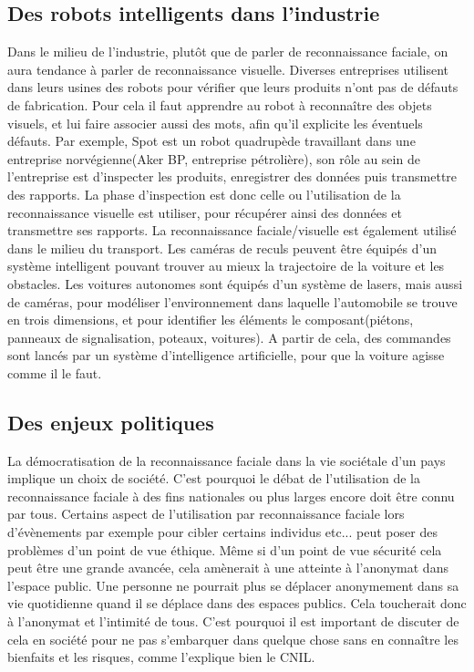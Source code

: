 \documentclass[12pt,french]{article}
\theoremstyle{plain}
\theoremstyle{definition}
\begin{document}
\subsection{Des robots intelligents dans l'industrie}
Dans le milieu de l'industrie, plutôt que de parler de reconnaissance faciale, on aura tendance à parler de reconnaissance visuelle. Diverses entreprises utilisent dans leurs usines des robots pour vérifier que leurs produits n'ont pas de défauts de fabrication. Pour cela il faut apprendre au robot à reconnaître des objets visuels, et lui faire associer aussi des mots, afin qu'il explicite les éventuels défauts. Par exemple, Spot est un robot quadrupède travaillant dans une entreprise norvégienne(Aker BP, entreprise pétrolière), son rôle au sein de l'entreprise est d'inspecter les produits, enregistrer des données puis transmettre des rapports. La phase d'inspection est donc celle ou l'utilisation de la reconnaissance visuelle est utiliser, pour récupérer ainsi des données et transmettre ses rapports.
La reconnaissance faciale/visuelle est également utilisé dans le milieu du transport. Les caméras de reculs peuvent être équipés d'un système intelligent pouvant trouver au mieux la trajectoire de la voiture et les obstacles. 
Les voitures autonomes sont équipés d'un système de lasers, mais aussi de caméras, pour modéliser l'environnement dans laquelle l'automobile se trouve en trois dimensions, et pour identifier les éléments le composant(piétons, panneaux de signalisation, poteaux, voitures). A partir de cela, des commandes sont lancés par un système d'intelligence artificielle, pour que la voiture agisse comme il le faut.
\subsection{Des enjeux politiques}
La démocratisation de la reconnaissance faciale dans la vie sociétale d'un pays implique un choix de société. C'est pourquoi le débat de l'utilisation de la reconnaissance faciale à des fins nationales ou plus larges encore doit être connu par tous. 
Certains aspect de l'utilisation par reconnaissance faciale lors d'évènements par exemple pour cibler certains individus etc... peut poser des problèmes d'un point de vue éthique.
Même si d'un point de vue sécurité cela peut être une grande avancée, cela amènerait à une atteinte à l'anonymat dans l'espace public. Une personne ne pourrait plus se déplacer anonymement dans sa vie quotidienne quand il se déplace dans des espaces publics. Cela toucherait donc à l'anonymat et l'intimité de tous. C'est pourquoi il est important de discuter de cela en société pour ne pas s'embarquer dans quelque chose sans en connaître les bienfaits et les risques, comme l'explique bien le CNIL.
\end{document}
